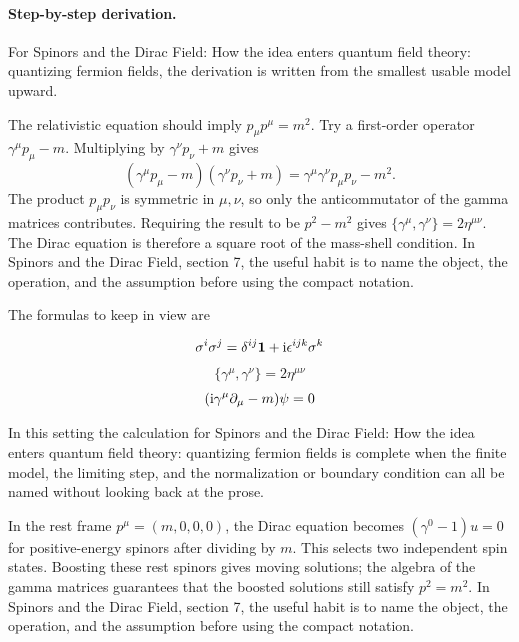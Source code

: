 \paragraph{Step-by-step derivation.}

For Spinors and the Dirac Field: How the idea enters quantum field theory: quantizing fermion fields, the derivation is written from the smallest usable model upward.

The relativistic equation should imply \(p_\mu p^\mu=m^2\).  Try a first-order operator \(\gamma^\mu p_\mu-m\).  Multiplying by \(\gamma^\nu p_\nu+m\) gives
\[
  (\gamma^\mu p_\mu-m)(\gamma^\nu p_\nu+m)
  =
  \gamma^\mu\gamma^\nu p_\mu p_\nu-m^2.
\]
The product \(p_\mu p_\nu\) is symmetric in \(\mu,\nu\), so only the anticommutator of the gamma matrices contributes.  Requiring the result to be \(p^2-m^2\) gives \(\{\gamma^\mu,\gamma^\nu\}=2\eta^{\mu\nu}\).  The Dirac equation is therefore a square root of the mass-shell condition.  In Spinors and the Dirac Field, section 7, the useful habit is to name the object, the operation, and the assumption before using the compact notation.

The formulas to keep in view are

\[
  \sigma^i\sigma^j=\delta^{ij}\mathbf 1+\mathrm i\epsilon^{ijk}\sigma^k
\]
\[
  \{\gamma^\mu,\gamma^\nu\}=2\eta^{\mu\nu}
\]
\[
  (\mathrm i\gamma^\mu\partial_\mu-m)\psi=0
\]

In this setting the calculation for Spinors and the Dirac Field: How the idea enters quantum field theory: quantizing fermion fields is complete when the finite model, the limiting step, and the normalization or boundary condition can all be named without looking back at the prose.




\begin{example}
In the rest frame \(p^\mu=(m,0,0,0)\), the Dirac equation becomes \((\gamma^0-1)u=0\) for positive-energy spinors after dividing by \(m\).  This selects two independent spin states.  Boosting these rest spinors gives moving solutions; the algebra of the gamma matrices guarantees that the boosted solutions still satisfy \(p^2=m^2\).  In Spinors and the Dirac Field, section 7, the useful habit is to name the object, the operation, and the assumption before using the compact notation.
\end{example}



